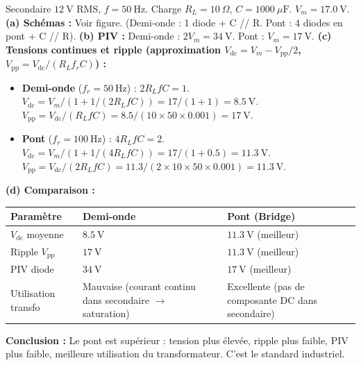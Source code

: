 \documentclass[11pt]{article}
\begin{document}
\begin{exoresolu}
Secondaire $12\ \mathrm{V}$ RMS, $f=50\ \mathrm{Hz}$. Charge $R_L = 10\ \Omega$, $C = 1000\ \mu\mathrm{F}$.
$V_m = 17.0\ \mathrm{V}$.
\textbf{(a) Schémas :} Voir figure. (Demi-onde : 1 diode + C // R. Pont : 4 diodes en pont + C // R).
\textbf{(b) PIV :} Demi-onde : $2V_m = 34\ \mathrm{V}$. Pont : $V_m = 17\ \mathrm{V}$.
\textbf{(c) Tensions continues et ripple (approximation $V_{\mathrm{dc}} = V_m - V_{\mathrm{pp}}/2$, $V_{\mathrm{pp}} = V_{\mathrm{dc}}/(R_L f_r C)$) :}
\begin{itemize}
\item \textbf{Demi-onde} ($f_r = 50\ \mathrm{Hz}$) : $2R_L f C = 1$.
$V_{\mathrm{dc}} = V_m / (1 + 1/(2R_L f C)) = 17 / (1+1) = 8.5\ \mathrm{V}$.
$V_{\mathrm{pp}} = V_{\mathrm{dc}} / (R_L f C) = 8.5 / (10 \times 50 \times 0.001) = 17\ \mathrm{V}$.
\item \textbf{Pont} ($f_r = 100\ \mathrm{Hz}$) : $4R_L f C = 2$.
$V_{\mathrm{dc}} = V_m / (1 + 1/(4R_L f C)) = 17 / (1+0.5) = 11.3\ \mathrm{V}$.
$V_{\mathrm{pp}} = V_{\mathrm{dc}} / (2 R_L f C) = 11.3 / (2 \times 10 \times 50 \times 0.001) = 11.3\ \mathrm{V}$.
\end{itemize}
\textbf{(d) Comparaison :}
\begin{center}
\begin{tabularx}{\linewidth}{|l|X|X|}\hline
\textbf{Paramètre} & \textbf{Demi-onde} & \textbf{Pont (Bridge)} \\ \hline
$V_{\mathrm{dc}}$ moyenne & $8.5\ \mathrm{V}$ & $11.3\ \mathrm{V}$ (meilleur) \\ \hline
Ripple $V_{\mathrm{pp}}$ & $17\ \mathrm{V}$ & $11.3\ \mathrm{V}$ (meilleur) \\ \hline
PIV diode & $34\ \mathrm{V}$ & $17\ \mathrm{V}$ (meilleur) \\ \hline
Utilisation transfo & Mauvaise (courant continu dans secondaire $\to$ saturation) & Excellente (pas de composante DC dans secondaire) \\ \hline
\end{tabularx}
\end{center}
\textbf{Conclusion :} Le pont est supérieur : tension plus élevée, ripple plus faible, PIV plus faible, meilleure utilisation du transformateur. C'est le standard industriel.
\end{exoresolu}
\end{document}
